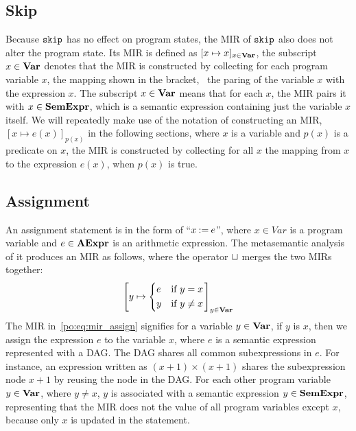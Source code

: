 \subsection{Skip}

Because $\mathtt{skip}$ has no effect on program states, the MIR of $\mathtt{skip}$
also does not alter the program state.  Its MIR is defined as $[x \mapsto
x]_{x \in \mathbf{Var}}$, the subscript $x \in \mathbf{Var}$ denotes that the MIR is
constructed by collecting for each program variable $x$, the mapping shown in
the bracket, \ie~the paring of the variable $x$ with the expression $x$.  The
subscript $x \in \mathbf{Var}$ means that for each $x$, the MIR pairs it with $x \in
\mathbf{SemExpr}$, which is a semantic expression containing just the variable $x$
itself.  We will repeatedly make use of the notation of constructing an MIR,
$[x \mapsto e(x)]_{p(x)}$ in the following sections, where $x$ is a variable
and $p(x)$ is a predicate on $x$, the MIR is constructed by collecting for all
$x$ the mapping from $x$ to the expression $e(x)$, when $p(x)$ is true.

\subsection{Assignment}

An assignment statement is in the form of ``$x \mathbin{:=} e$'', where $x \in Var$
is a program variable and $e \in \mathbf{AExpr}$ is an arithmetic expression.  The
metasemantic analysis of it produces an MIR as follows, where the operator
$\sqcup$ merges the two MIRs together:
\begin{equation}
    \left[
        y \mapsto \left\{
            \begin{aligned}
                & e && \text{if~} y = x \\
                & y && \text{if~} y \neq x
            \end{aligned}
        \right.
    \right]_{y \in \mathbf{Var}}
    \label{po:eq:mir_assign}
\end{equation}
The MIR in~\eqref{po:eq:mir_assign} signifies for a variable $y \in \mathbf{Var}$,
if $y$ is $x$, then we assign the expression $e$ to the variable $x$, where
$e$ is a semantic expression represented with a DAG\@.  The DAG shares all
common subexpressions in $e$.  For instance, an expression written as $(x + 1)
\times (x + 1)$ shares the subexpression node $x + 1$ by reusing the node in
the DAG\@.  For each other program variable $y \in \mathbf{Var}$, where $y \neq x$,
$y$ is associated with a semantic expression $y \in \mathbf{SemExpr}$, representing
that the MIR does not the value of all program variables except $x$, because
only $x$ is updated in the statement.

